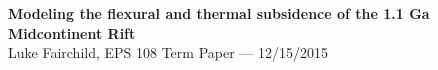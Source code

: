 \documentclass[12pt,letterpaper]{article}
\begin{document}
\thispagestyle{empty}
\begin{flushleft}
{\Large \textbf{Modeling the flexural and thermal subsidence of the 1.1 Ga Midcontinent Rift}}\\
\vspace{0.3em}
Luke Fairchild, EPS 108 Term Paper --- 12/15/2015
\end{flushleft}
\end{document}
